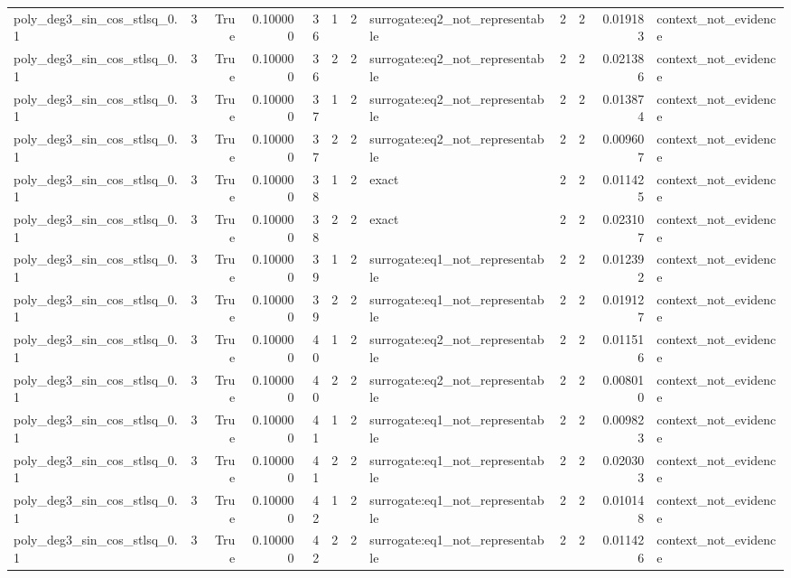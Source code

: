 \begin{tabular}{lrrrrrrlrrrl}
poly\_deg3\_sin\_cos\_stlsq\_0.1 & 3 & True & 0.100000 & 36 & 1 & 2 & surrogate:eq2\_not\_representable & 2 & 2 & 0.019183 & context\_not\_evidence \\
poly\_deg3\_sin\_cos\_stlsq\_0.1 & 3 & True & 0.100000 & 36 & 2 & 2 & surrogate:eq2\_not\_representable & 2 & 2 & 0.021386 & context\_not\_evidence \\
poly\_deg3\_sin\_cos\_stlsq\_0.1 & 3 & True & 0.100000 & 37 & 1 & 2 & surrogate:eq2\_not\_representable & 2 & 2 & 0.013874 & context\_not\_evidence \\
poly\_deg3\_sin\_cos\_stlsq\_0.1 & 3 & True & 0.100000 & 37 & 2 & 2 & surrogate:eq2\_not\_representable & 2 & 2 & 0.009607 & context\_not\_evidence \\
poly\_deg3\_sin\_cos\_stlsq\_0.1 & 3 & True & 0.100000 & 38 & 1 & 2 & exact & 2 & 2 & 0.011425 & context\_not\_evidence \\
poly\_deg3\_sin\_cos\_stlsq\_0.1 & 3 & True & 0.100000 & 38 & 2 & 2 & exact & 2 & 2 & 0.023107 & context\_not\_evidence \\
poly\_deg3\_sin\_cos\_stlsq\_0.1 & 3 & True & 0.100000 & 39 & 1 & 2 & surrogate:eq1\_not\_representable & 2 & 2 & 0.012392 & context\_not\_evidence \\
poly\_deg3\_sin\_cos\_stlsq\_0.1 & 3 & True & 0.100000 & 39 & 2 & 2 & surrogate:eq1\_not\_representable & 2 & 2 & 0.019127 & context\_not\_evidence \\
poly\_deg3\_sin\_cos\_stlsq\_0.1 & 3 & True & 0.100000 & 40 & 1 & 2 & surrogate:eq2\_not\_representable & 2 & 2 & 0.011516 & context\_not\_evidence \\
poly\_deg3\_sin\_cos\_stlsq\_0.1 & 3 & True & 0.100000 & 40 & 2 & 2 & surrogate:eq2\_not\_representable & 2 & 2 & 0.008010 & context\_not\_evidence \\
poly\_deg3\_sin\_cos\_stlsq\_0.1 & 3 & True & 0.100000 & 41 & 1 & 2 & surrogate:eq1\_not\_representable & 2 & 2 & 0.009823 & context\_not\_evidence \\
poly\_deg3\_sin\_cos\_stlsq\_0.1 & 3 & True & 0.100000 & 41 & 2 & 2 & surrogate:eq1\_not\_representable & 2 & 2 & 0.020303 & context\_not\_evidence \\
poly\_deg3\_sin\_cos\_stlsq\_0.1 & 3 & True & 0.100000 & 42 & 1 & 2 & surrogate:eq1\_not\_representable & 2 & 2 & 0.010148 & context\_not\_evidence \\
poly\_deg3\_sin\_cos\_stlsq\_0.1 & 3 & True & 0.100000 & 42 & 2 & 2 & surrogate:eq1\_not\_representable & 2 & 2 & 0.011426 & context\_not\_evidence \\

\end{tabular}
